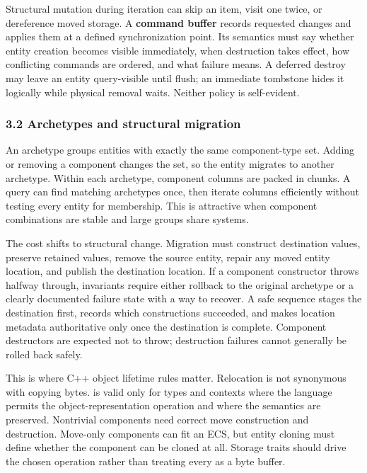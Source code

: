 Structural mutation during iteration can skip an item, visit one twice, or dereference moved storage. A \textbf{command buffer} records requested changes and applies them at a defined synchronization point. Its semantics must say whether entity creation becomes visible immediately, when destruction takes effect, how conflicting commands are ordered, and what failure means. A deferred destroy may leave an entity query-visible until flush; an immediate tombstone hides it logically while physical removal waits. Neither policy is self-evident.

\subsubsection{3.2 Archetypes and structural migration}\label{05-engine-i-ch008-archetypes-and-structural-migration}

\hypertarget{05-engine-i-ch008-archetypes-and-structural-migration}{}

An archetype groups entities with exactly the same component-type set. Adding or removing a component changes the set, so the entity migrates to another archetype. Within each archetype, component columns are packed in chunks. A query can find matching archetypes once, then iterate columns efficiently without testing every entity for membership. This is attractive when component combinations are stable and large groups share systems.

The cost shifts to structural change. Migration must construct destination values, preserve retained values, remove the source entity, repair any moved entity location, and publish the destination location. If a component constructor throws halfway through, invariants require either rollback to the original archetype or a clearly documented failure state with a way to recover. A safe sequence stages the destination first, records which constructions succeeded, and makes location metadata authoritative only once the destination is complete. Component destructors are expected not to throw; destruction failures cannot generally be rolled back safely.

This is where C++ object lifetime rules matter. Relocation is not synonymous with copying bytes.  is valid only for types and contexts where the language permits the object-representation operation and where the semantics are preserved. Nontrivial components need correct move construction and destruction. Move-only components can fit an ECS, but entity cloning must define whether the component can be cloned at all. Storage traits should drive the chosen operation rather than treating every  as a byte buffer.

